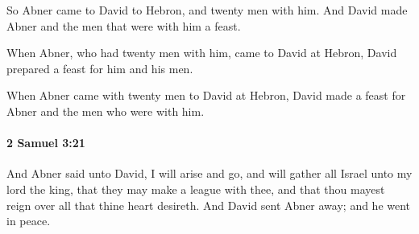 			\begin{versebox}
					\item[BHS] 
					\item[ASV] So Abner came to David to Hebron, and twenty men with him. And David made Abner and the men that were with him a feast.
					\item[NIV] When Abner, who had twenty men with him, came to David at Hebron, David prepared a feast for him and his men.
					\item[NRSV] When Abner came with twenty men to David at Hebron, David made a feast for Abner and the men who were with him.
			\end{versebox}

		\paragraph{2 Samuel 3:21} %
			\label{2SAMUEL-3-21}

			And Abner said unto David, I will arise and go, and will gather all Israel unto my lord the king, that they may make a league with thee, and that thou mayest reign over all that thine heart desireth. And David sent Abner away; and he went in peace.

